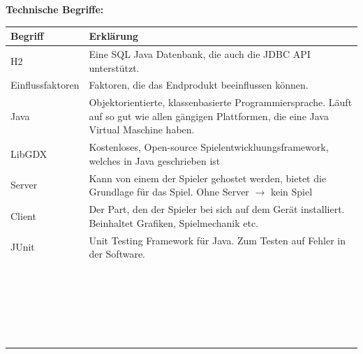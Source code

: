 \documentclass[fontsize=12pt,paper=a4,twoside]{scrartcl}
\begin{document}
\textbf{Technische Begriffe:}
\begin{center}
\begin{tabular}{|p{3cm}|p{12cm}|}
\hline
Begriff & Erklärung \\ \hline
H2 & Eine SQL Java Datenbank, die auch die JDBC API unterstützt. \\ \hline
Einflussfaktoren & Faktoren, die das Endprodukt beeinflussen können. \\ \hline
Java & Objektorientierte, klassenbasierte Programmiersprache. Läuft auf so gut wie allen gängigen Plattformen, die eine Java Virtual Maschine haben.\\ \hline  
LibGDX & Kostenloses, Open-source Spielentwickluungsframework, welches in Java geschrieben ist\\ \hline
Server & Kann von einem der Spieler gehostet werden, bietet die Grundlage für das Spiel. Ohne Server $\rightarrow$ kein Spiel \\ \hline
Client & Der Part, den der Spieler bei sich auf dem Gerät installiert. Beinhaltet Grafiken, Spielmechanik etc. \\ \hline
JUnit & Unit Testing Framework für Java. Zum Testen auf Fehler in der Software.\\ \hline  
 & \\ \hline
 & \\ \hline
 & \\ \hline
 & \\ \hline  
 & \\ \hline
 & \\ \hline
 & \\ \hline
 & \\ \hline  
 & \\ \hline
 & \\ \hline
 & \\ \hline
 & \\ \hline  
 & \\ \hline
 & \\ \hline
 & \\ \hline
 & \\ \hline  
 & \\ \hline
 & \\ \hline
 & \\ \hline
 & \\ \hline  
 & \\ \hline
 & \\ \hline
 & \\ \hline
 
\end{tabular}
\end{center}
\end{document}
